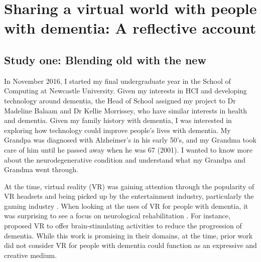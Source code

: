 \chapter{Sharing a virtual world with people with dementia: A reflective account}
\label{NegotatingReseacherParticipantRelationships}

\section{Study one: Blending old with the new}
\label{StudyOne}
In November 2016, I started my final undergraduate year in the School of Computing at Newcastle University. Given my interests in  HCI and developing technology around dementia, the Head of School assigned my project to Dr Madeline Balaam and Dr Kellie Morrissey, who have similar interests in health and dementia. Given my family history with dementia, I was interested in exploring how technology could improve people's lives with dementia. My Grandpa was diagnosed with Alzheimer’s in his early 50’s, and my Grandma took care of him until he passed away when he was 67 (2001). I wanted to know more about the neurodegenerative condition and understand what my Grandpa and Grandma went through. 

At the time, virtual reality (VR) was gaining attention through the popularity of VR headsets and being picked up by the entertainment industry, particularly the gaming industry \citep{cipriani_understanding_2014}. When looking at the uses of VR for people with dementia, it was surprising to see a focus on neurological rehabilitation \citep{schultheis_application_2001,mendez2015virtual}. For instance, \citep{garcia2012discussion} proposed VR to offer brain-stimulating activities to reduce the progression of dementia. While this work is promising in their domains, at the time, prior work did not consider VR for people with dementia could function as an expressive and creative medium.

